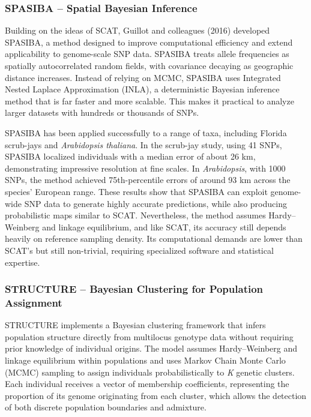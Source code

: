 \subsubsection{SPASIBA – Spatial Bayesian Inference}

Building on the ideas of SCAT, Guillot and colleagues (2016) \cite{guillot2016accurate} developed SPASIBA, a method designed to improve computational efficiency and extend applicability to genome-scale SNP data. SPASIBA treats allele frequencies as spatially autocorrelated random fields, with covariance decaying as geographic distance increases. Instead of relying on MCMC, SPASIBA uses Integrated Nested Laplace Approximation (INLA), a deterministic Bayesian inference method that is far faster and more scalable. This makes it practical to analyze larger datasets with hundreds or thousands of SNPs.

SPASIBA has been applied successfully to a range of taxa, including Florida scrub-jays and \textit{Arabidopsis thaliana}. In the scrub-jay study, using 41 SNPs, SPASIBA localized individuals with a median error of about 26 km, demonstrating impressive resolution at fine scales. In \textit{Arabidopsis}, with 1000 SNPs, the method achieved 75th-percentile errors of around 93 km across the species' European range. These results show that SPASIBA can exploit genome-wide SNP data to generate highly accurate predictions, while also producing probabilistic maps similar to SCAT. Nevertheless, the method assumes Hardy–Weinberg and linkage equilibrium, and like SCAT, its accuracy still depends heavily on reference sampling density. Its computational demands are lower than SCAT's but still non-trivial, requiring specialized software and statistical expertise.

\subsubsection{STRUCTURE – Bayesian Clustering for Population Assignment}

STRUCTURE \cite{pritchard2000inference} implements a Bayesian clustering framework that infers population structure directly from multilocus genotype data without requiring prior knowledge of individual origins. The model assumes Hardy–Weinberg and linkage equilibrium within populations and uses Markov Chain Monte Carlo (MCMC) sampling to assign individuals probabilistically to \textit{K} genetic clusters. Each individual receives a vector of membership coefficients, representing the proportion of its genome originating from each cluster, which allows the detection of both discrete population boundaries and admixture.

